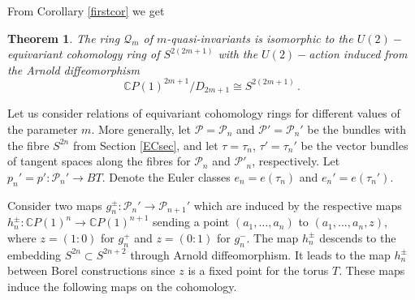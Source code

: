\documentclass[11pt]{amsart}
\newtheorem{theorem}{Theorem}[section]
\theoremstyle{definition}
\theoremstyle{remark}
\numberwithin{equation}{section}
\newcommand{\la}{\label}
\begin{document}
From Corollary \ref{firstcor} we get
%
\begin{theorem} \la{heqar}
    The ring $\mathcal{Q}_m$ of $m$-quasi-invariants is isomorphic to the $U(2)-$equivariant cohomology ring of $S^{2(2m+1)}$ with the $U(2)-$action induced from the Arnold diffeomorphism 
    $$
    \mathbb CP(1)^{2m+1}/D_{2m+1} \cong S^{2(2m+1)}\,.
    $$
\end{theorem}
%
Let us consider relations of equivariant cohomology rings for different values of the parameter $m$. More generally, let ${\mathcal P} ={\mathcal P}_n$ and ${\mathcal P'}={\mathcal P}_n'$ be the bundles with the fibre $S^{2n}$ from Section \ref{ECsec}, and let $\tau=\tau_n$, $\tau'=\tau_n'$ be the vector bundles of tangent spaces along the fibres for ${\mathcal P}_n$ and ${\mathcal P}'_n$, respectively. Let $p_n'=p'\colon {\mathcal P_n'} \to BT$. Denote the  Euler classes $e_n=e(\tau_n)$ and $e_n'=e(\tau_n')$. 

Consider two maps $g_n^{\pm}\colon {\mathcal P_n'} \to {\mathcal P_{n+1}'}$ which are induced by the respective maps $h_n^{\pm}\colon \mathbb C P(1)^n \to \mathbb C P(1)^{n+1}$ sending a point $(a_1, \ldots, a_n)$ to $(a_1, \ldots, a_n, z)$, where $z=(1:0)$ for $g_n^+$ and $z=(0:1)$ for $g_n^-$. The map $h_n^{\pm}$ descends to the embedding $S^{2n} \subset S^{2n+2}$ through Arnold diffeomorphism. It leads to the map $h_n^{\pm}$ between Borel constructions since $z$ is a fixed point for the torus $T$. These maps induce the following maps on the cohomology.
\end{document}
